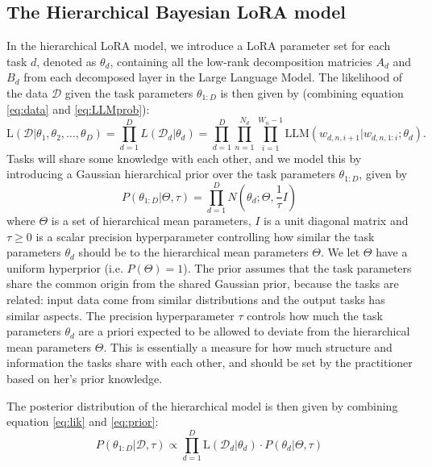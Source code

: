 \documentclass{article}
\begin{document}
\subsection{The Hierarchical Bayesian LoRA model} \label{sec:BoRA}
In the hierarchical LoRA model, we introduce a LoRA parameter set for each task $d$, denoted as $\theta_d$, containing all the low-rank decomposition matricies $A_d$ and $B_d$ from each decomposed layer in the Large Language Model. The likelihood of the data $\mathcal{D}$ given the task parameters $\theta_{1:D}$ is then given by (combining equation \ref{eq:data} and \ref{eq:LLMprob}):
\begin{equation} \label{eq:lik}
    \text{L}(\mathcal{D} | \theta_1, \theta_2, \ldots, \theta_D) = \prod_{d=1}^D L(\mathcal{D}_d | \theta_d) = \prod_{d=1}^D \prod_{n=1}^{N_d} \prod_{i=1}^{W_n-1} \text{LLM}(w_{d,n,i+1} | w_{d,n,1:i}; \theta_d).
\end{equation}
%
%
Tasks will share some knowledge with each other, and we model this by introducing a Gaussian hierarchical prior over the task parameters $\theta_{1:D}$, given by
\begin{equation} \label{eq:prior}
    P(\theta_{1:D} | \Theta, \tau ) = \prod_{d=1}^D N(\theta_d ; \Theta, \frac{1}{\tau} I)
\end{equation}
%
where $\Theta$ is a set of hierarchical mean parameters, $I$ is a unit diagonal matrix and $\tau \geq 0$ is a scalar precision hyperparameter controlling how similar the task parameters $\theta_d$ should be to the hierarchical mean parameters $\Theta$.
We let $\Theta$ have a uniform hyperprior (i.e. $P(\Theta) = 1$). The prior assumes that the task parameters share the common origin from the shared Gaussian prior, because the tasks are related: input data come from similar distributions and the output tasks has similar aspects. 
The precision hyperparameter $\tau$ controls how much the task parameters $\theta_d$ are a priori expected to be allowed to deviate from the hierarchical mean parameters $\Theta$. 
This is essentially a measure for how much structure and information the tasks share with each other, and should be set by the practitioner based on her's prior knowledge.

The posterior distribution of the hierarchical model is then given by combining equation \ref{eq:lik} and \ref{eq:prior}:
\begin{equation} \label{eq:posterior}
    P(\theta_{1:D} | \mathcal{D}, \tau) \propto \prod_{d=1}^D \text{L}(\mathcal{D}_d | \theta_d) \cdot P(\theta_d | \Theta, \tau)
\end{equation}
%
%
\end{document}
